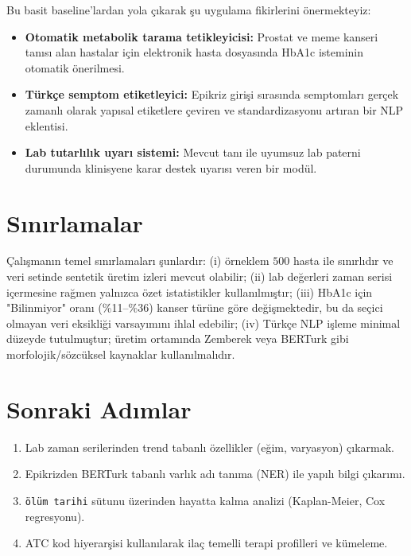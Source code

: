 \documentclass[11pt,a4paper]{article}
\begin{document}
Bu basit baseline'lardan yola çıkarak şu uygulama fikirlerini önermekteyiz:

\begin{itemize}[leftmargin=1.5em,itemsep=1pt]
    \item \textbf{Otomatik metabolik tarama tetikleyicisi:} Prostat ve meme kanseri tanısı alan hastalar için elektronik hasta dosyasında HbA1c isteminin otomatik önerilmesi.
    \item \textbf{Türkçe semptom etiketleyici:} Epikriz girişi sırasında semptomları gerçek zamanlı olarak yapısal etiketlere çeviren ve standardizasyonu artıran bir NLP eklentisi.
    \item \textbf{Lab tutarlılık uyarı sistemi:} Mevcut tanı ile uyumsuz lab paterni durumunda klinisyene karar destek uyarısı veren bir modül.
\end{itemize}

\section{Sınırlamalar}

Çalışmanın temel sınırlamaları şunlardır: (i) örneklem $500$ hasta ile sınırlıdır ve veri setinde sentetik üretim izleri mevcut olabilir; (ii) lab değerleri zaman serisi içermesine rağmen yalnızca özet istatistikler kullanılmıştır; (iii) HbA1c için "Bilinmiyor" oranı (\%11--\%36) kanser türüne göre değişmektedir, bu da seçici olmayan veri eksikliği varsayımını ihlal edebilir; (iv) Türkçe NLP işleme minimal düzeyde tutulmuştur; üretim ortamında Zemberek veya BERTurk gibi morfolojik/sözcüksel kaynaklar kullanılmalıdır.

\section{Sonraki Adımlar}

\begin{enumerate}[leftmargin=1.5em,itemsep=1pt]
    \item Lab zaman serilerinden trend tabanlı özellikler (eğim, varyasyon) çıkarmak.
    \item Epikrizden BERTurk tabanlı varlık adı tanıma (NER) ile yapılı bilgi çıkarımı.
    \item \texttt{ölüm tarihi} sütunu üzerinden hayatta kalma analizi (Kaplan-Meier, Cox regresyonu).
    \item ATC kod hiyerarşisi kullanılarak ilaç temelli terapi profilleri ve kümeleme.
\end{enumerate}
\end{document}
